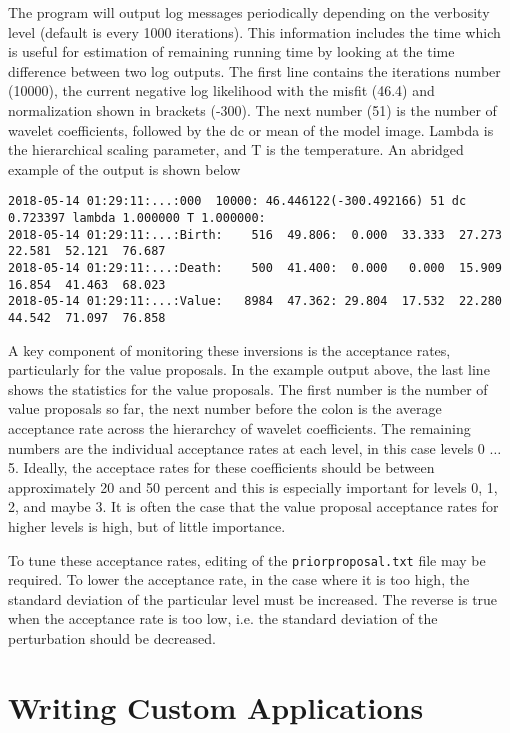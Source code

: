 \documentclass[a4paper,12pt]{article}
\begin{document}
The program will output log messages periodically depending on the
verbosity level (default is every 1000 iterations). This information
includes the time which is useful for estimation of remaining running
time by looking at the time difference between two log outputs.  The
first line contains the iterations number (10000), the current
negative log likelihood with the misfit (46.4) and normalization shown
in brackets (-300). The next number (51) is the number of wavelet
coefficients, followed by the dc or mean of the model image. Lambda is
the hierarchical scaling parameter, and T is the temperature.  An
abridged example of the output is shown below

{
  \tiny
\begin{verbatim}
2018-05-14 01:29:11:...:000  10000: 46.446122(-300.492166) 51 dc 0.723397 lambda 1.000000 T 1.000000:
2018-05-14 01:29:11:...:Birth:    516  49.806:  0.000  33.333  27.273  22.581  52.121  76.687 
2018-05-14 01:29:11:...:Death:    500  41.400:  0.000   0.000  15.909  16.854  41.463  68.023 
2018-05-14 01:29:11:...:Value:   8984  47.362: 29.804  17.532  22.280  44.542  71.097  76.858 
\end{verbatim}
}

A key component of monitoring these inversions is the acceptance
rates, particularly for the value proposals. In the example output
above, the last line shows the statistics for the value proposals. The
first number is the number of value proposals so far, the next number
before the colon is the average acceptance rate across the hierarchcy
of wavelet coefficients. The remaining numbers are the individual
acceptance rates at each level, in this case levels 0 $\ldots$
5. Ideally, the acceptace rates for these coefficients should be
between approximately 20 and 50 percent and this is especially
important for levels 0, 1, 2, and maybe 3. It is often the case that
the value proposal acceptance rates for higher levels is high, but of
little importance.

To tune these acceptance rates, editing of the {\tt priorproposal.txt}
file may be required. To lower the acceptance rate, in the case where it is too
high, the standard deviation of the particular level must be increased. The
reverse is true when the acceptance rate is too low, i.e. the standard deviation
of the perturbation should be decreased.

\section{Writing Custom Applications}
\end{document}
